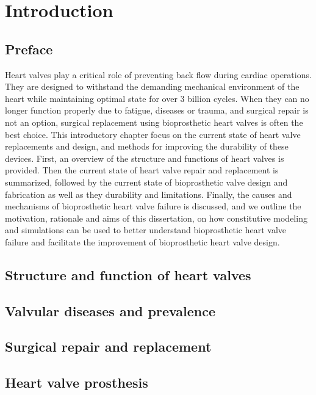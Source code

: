 \chapter{Introduction} %

\section{Preface}

    Heart valves play a critical role of preventing back flow during cardiac operations. They are designed to withstand the demanding mechanical environment of the heart while maintaining optimal state for over 3 billion cycles. When they can no longer function properly due to fatigue, diseases or trauma, and surgical repair is not an option, surgical replacement using bioprosthetic heart valves is often the best choice. This introductory chapter focus on the current state of heart valve replacements and design, and methods for improving the durability of these devices. First, an overview of the structure and functions of heart valves is provided. Then the current state of heart valve repair and replacement is summarized, followed by the current state of bioprosthetic valve design and fabrication as well as they durability and limitations. Finally, the causes and mechanisms of bioprosthetic heart valve failure is discussed, and we outline the motivation, rationale and aims of this dissertation, on how constitutive modeling and simulations can be used to better understand bioprosthetic heart valve failure and facilitate the improvement of bioprosthetic heart valve design. 


\section{Structure and function of heart valves}


\section{Valvular diseases and prevalence}


\section{Surgical repair and replacement}


\section{Heart valve prosthesis}

